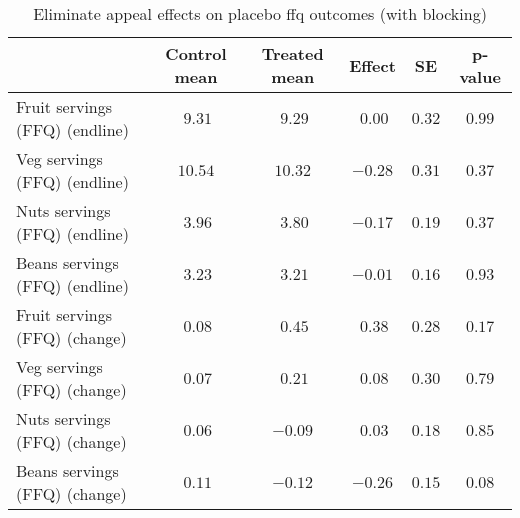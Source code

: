 \begin{table*}[ht]
\caption{Eliminate appeal effects on placebo ffq outcomes (with blocking)\label{round}} 
\begin{center}
\begin{tabular}{lccccc}
\hline\hline
\multicolumn{1}{l}{}&\multicolumn{1}{c}{Control mean}&\multicolumn{1}{c}{Treated mean}&\multicolumn{1}{c}{Effect}&\multicolumn{1}{c}{SE}&\multicolumn{1}{c}{p-value}\tabularnewline
\hline
Fruit servings (FFQ) (endline)&$~9.31$&$~9.29$&$~0.00$&$0.32$&$0.99$\tabularnewline
Veg servings (FFQ) (endline)&$10.54$&$10.32$&$-0.28$&$0.31$&$0.37$\tabularnewline
Nuts servings (FFQ) (endline)&$~3.96$&$~3.80$&$-0.17$&$0.19$&$0.37$\tabularnewline
Beans servings (FFQ) (endline)&$~3.23$&$~3.21$&$-0.01$&$0.16$&$0.93$\tabularnewline
Fruit servings (FFQ) (change)&$~0.08$&$~0.45$&$~0.38$&$0.28$&$0.17$\tabularnewline
Veg servings (FFQ) (change)&$~0.07$&$~0.21$&$~0.08$&$0.30$&$0.79$\tabularnewline
Nuts servings (FFQ) (change)&$~0.06$&$-0.09$&$~0.03$&$0.18$&$0.85$\tabularnewline
Beans servings (FFQ) (change)&$~0.11$&$-0.12$&$-0.26$&$0.15$&$0.08$\tabularnewline
\hline
\end{tabular}\end{center}

\end{table*}
